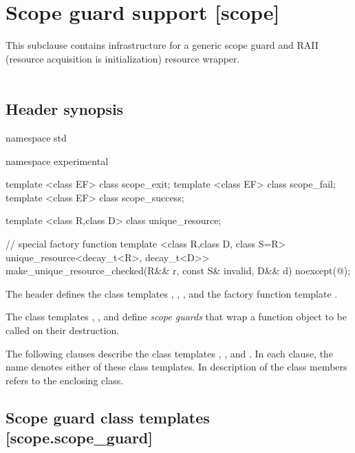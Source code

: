 \documentclass[ebook,11pt,article]{memoir}
\begin{document}
\section{Scope guard support [scope]}
This subclause contains infrastructure for a generic scope guard and RAII (resource acquisition is initialization) resource wrapper.\\
\\
\subsection{Header  synopsis}


\begin{codeblock}
namespace std {
namespace experimental {
template <class EF>
  class scope_exit;
template <class EF>
  class scope_fail;
template <class EF>
  class scope_success;

template <class R,class D>
  class unique_resource;

// special factory function
template <class R,class D, class S=R>
  unique_resource<decay_t<R>, decay_t<D>>
  make_unique_resource_checked(R&& r, const S& invalid, D&& d) noexcept(@\seebelow@);
}}
\end{codeblock}

\pnum
The header   defines the class templates , , ,  and
the factory function template .

\pnum 
The class templates , , and  define\emph{ scope guards} that wrap a function object to be called on their destruction.

\pnum
The following clauses describe the class templates , , and . In each clause, the name  denotes either of these class templates. In description of the class members  refers to the enclosing class.

\newpage
\subsection {Scope guard class templates [scope.scope_guard]}
\end{document}
